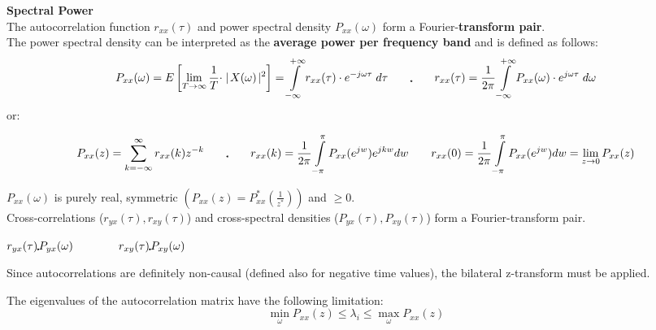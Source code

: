 		\textbf{Spectral Power}\\
		The autocorrelation function $r_{xx}(\tau)$ and power spectral density $P_{xx}(\omega)$ form a
		Fourier-\textbf{transform pair}. \\ The power spectral density can be interpreted as the \textbf{average power per frequency band} and is
		defined as follows:                             
				$$ P_{xx}(\omega) = E\left[ \lim\limits_{T \rightarrow \infty}
											\frac{1}{T} \cdot \mid\! X(\omega) \!\mid^{2}\right]                          
									= \int\limits_{-\infty}^{+\infty} r_{xx}(\tau) \cdot e^{-j\omega\tau} \; d\tau 
									\qquad \IFT \qquad
				r_{xx}(\tau)   = \frac{1}{2\pi} \int\limits_{-\infty}^{+\infty} 
									 P_{xx}(\omega) \cdot e^{j\omega\tau} \; d\omega$$ 
				or:
				 
				$$P_{xx}(z) = \sum\limits_{k=-\infty}^{\infty} r_{xx}(k)z^{-k}\qquad \IFT \qquad 
				r_{xx}(k)=\frac 1{2\pi} \int \limits_{-\pi}^{\pi} P_{xx}(e^{jw})e^{jkw}dw \qquad 
				r_{xx}(0) =\frac 1{2\pi} \int \limits_{-\pi}^{\pi} P_{xx}(e^{jw})dw = \lim\limits_{z \rightarrow 0} P_{xx}(z)$$
									 
		$P_{xx}(\omega)$ is purely real, symmetric $(P_{xx}(z)=P_{xx}^*(\frac{1}{z^*}))$ and $\geq 0$. \\
		Cross-correlations ($r_{yx}(\tau), r_{xy}(\tau)$) and cross-spectral densities ($P_{yx}(\tau),
		P_{xy}(\tau)$) form a Fourier-transform pair.
		\begin{center}
		$ r_{yx}(\tau) \FT P_{yx}(\omega) \qquad \qquad r_{xy}(\tau) \FT P_{xy}(\omega)  $
		\end{center}
		Since autocorrelations are definitely non-causal (defined also for negative time values), the bilateral z-transform must be applied.
		
		The eigenvalues of the autocorrelation matrix have the following limitation:\\
		$$\min\limits_\omega P_{xx}(z)\leq \lambda_i \leq \max\limits_{\omega}P_{xx}(z)$$
		

